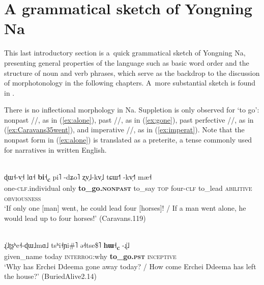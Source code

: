\section{A grammatical sketch of Yongning Na}
\label{sec:sketch}

This last introductory section is a~quick grammatical sketch of Yongning Na, presenting general properties of the language such as basic {word order} and the structure of noun and verb phrases, which serve as the backdrop to the discussion of morphotonology in the following chapters. A~more substantial sketch is found in \citet{lidz2016}.


There is no inflectional morphology in Na. Suppletion is only observed for ‘to go’: {nonpast} //, as in (\ref{ex:alone}), {past} //, as in (\ref{ex:gone}), {past perfective} //, as in (\ref{ex:Caravans35went}), and {imperative} //, as in (\ref{ex:imperat}). Note that the {nonpast} form in (\ref{ex:alone}) is translated as a preterite, a tense commonly used for narratives in written {English}.
 
\begin{exe}
	\ex
	\label{ex:alone}
	\\
	\gll ɖɯ˧-v̩˧						lɑ˧		\textbf{bi˧\textsubscript{c}}			pi˥		-dʑo˥				ʐv̩˩-kv̩˩					tɕɯ˧˥		-kv̩˧˥		mæ˧\\
	one-\textsc{clf}.individual		only	\textbf{to\_go.\textsc{nonpast}}		to\_say		\textsc{top}		four-\textsc{clf}	to\_lead	\textsc{abilitive}	\textsc{obviousness}\\
	\glt ‘If only one [man] went, he could lead four [horses]! / If a man went alone, he would lead up to four horses!’ (Caravans.119) 
\end{exe}


\begin{exe}
  	\ex
  	\label{ex:gone}
  	\\
  	\gll ɻ̍˩ʈʂʰe˧-ɖɯ˩mɑ˩	tsʰi˧ɲi\#˥	ə˧tse\$˥							\textbf{hɯ˧\textsubscript{c}}						-ɻ̍˩\\
  	given\_name				today		\textsc{interrog}:why		\textbf{to\_go.\textsc{pst}}		\textsc{inceptive}\\
  	\glt ‘Why has Erchei Ddeema gone away today? / How come Erchei Ddeema has left the house?’ (BuriedAlive2.14)
\end{exe}
  
